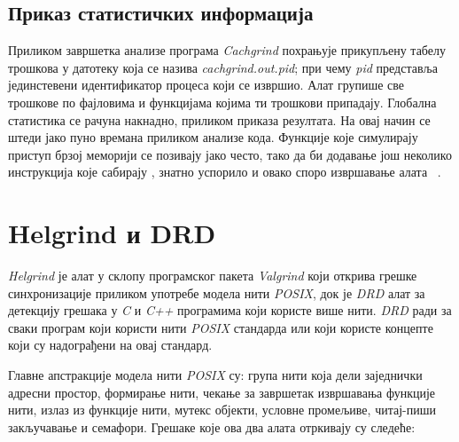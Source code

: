 \documentclass[12pt,oneside]{memoir}
\begin{document}
\subsection{Приказ статистичких информација}

\indent Приликом завршетка анализе програма \textit{Cachgrind} похрањује прикупљену табелу трошкова у датотеку која се назива \textit{cachgrind.out.pid}; при чему \textit{pid} представља јединстевени идентификатор процеса који се извршио. Алат групише све трошкове по фајловима и функцијама којима ти трошкови припадају. Глобална статистика се рачуна накнадно, приликом приказа резултата. На овај начин се штеди јако пуно времана приликом анализе кода. Функције које симулирају приступ брзој меморији се позивају јако често, тако да би додавање још неколико инструкција које сабирају , знатно успорило и овако споро извршавање алата ~\cite{cachegrindRef}.

\section{Helgrind и DRD}
\label{section_helgrind}

\indent \textit{Helgrind} је алат у склопу програмског пакета \textit{Valgrind} који открива грешке синхронизације приликом употребе модела нити \textit{POSIX}, док је \textit{DRD} алат за детекцију грешака у \textit{C} и \textit{C++} програмима који користе више нити. \textit{DRD} ради за сваки програм који користи нити \textit{POSIX} стандарда или који користе концепте који су надограђени на овај стандард.

\indent Главне апстракције модела нити \textit{POSIX} су: група нити која дели заједнички адресни простор, формирање нити, чекање за завршетак извршавања функције нити, излаз из функције нити, мутекс објекти, условне промељиве, читај-пиши закључавање и семафори. Грешаке које ова два алата отркивају су следеће:
\end{document}
